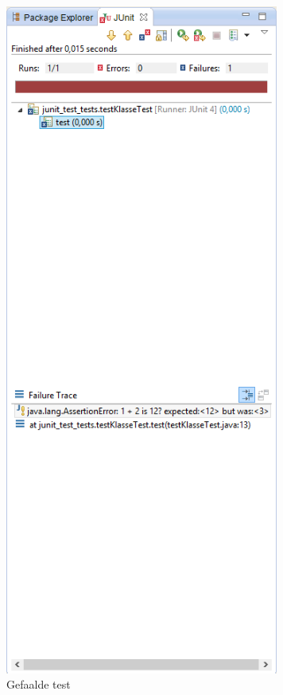 \documentclass{book}
\begin{document}
\begin{figure}[ht!]
\centering
\includegraphics[width=90mm]{testfail.png}
\caption{Gefaalde test}
\end{figure}
\end{document}
